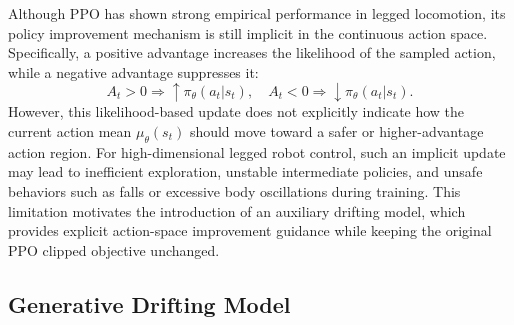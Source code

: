 \documentclass[conference]{IEEEtran}
\begin{document}
Although PPO has shown strong empirical performance in legged locomotion, its policy improvement mechanism is still implicit in the continuous action space. Specifically, a positive advantage increases the likelihood of the sampled action, while a negative advantage suppresses it:
\begin{equation}
\label{eq:ppo_adv_likelihood}
    A_t>0 \Rightarrow \uparrow \pi_{\theta}(a_t|s_t),
    \quad
    A_t<0 \Rightarrow \downarrow \pi_{\theta}(a_t|s_t).
\end{equation}
However, this likelihood-based update does not explicitly indicate how the current action mean $\mu_{\theta}(s_t)$ should move toward a safer or higher-advantage action region. For high-dimensional legged robot control, such an implicit update may lead to inefficient exploration, unstable intermediate policies, and unsafe behaviors such as falls or excessive body oscillations during training. This limitation motivates the introduction of an auxiliary drifting model, which provides explicit action-space improvement guidance while keeping the original PPO clipped objective unchanged.



\subsection{Generative Drifting Model}
\label{subsec:generative_drifting_model}
\end{document}
